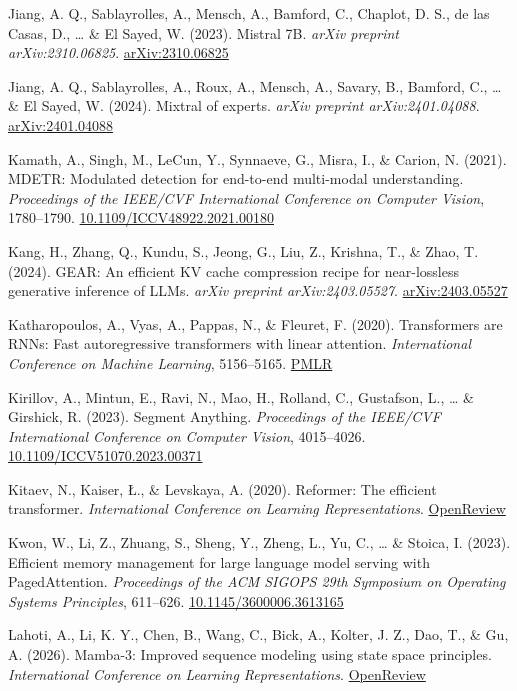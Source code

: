 \documentclass[10pt,twocolumn]{article}
\begin{document}
Jiang, A. Q., Sablayrolles, A., Mensch, A., Bamford, C., Chaplot, D. S., de las Casas, D., \ldots{} \& El Sayed, W. (2023). Mistral 7B. \emph{arXiv preprint arXiv:2310.06825}. \href{https://arxiv.org/abs/2310.06825}{arXiv:2310.06825}

Jiang, A. Q., Sablayrolles, A., Roux, A., Mensch, A., Savary, B., Bamford, C., \ldots{} \& El Sayed, W. (2024). Mixtral of experts. \emph{arXiv preprint arXiv:2401.04088}. \href{https://arxiv.org/abs/2401.04088}{arXiv:2401.04088}

Kamath, A., Singh, M., LeCun, Y., Synnaeve, G., Misra, I., \& Carion, N. (2021). MDETR: Modulated detection for end-to-end multi-modal understanding. \emph{Proceedings of the IEEE/CVF International Conference on Computer Vision}, 1780--1790. \href{https://doi.org/10.1109/ICCV48922.2021.00180}{10.1109/ICCV48922.2021.00180}

Kang, H., Zhang, Q., Kundu, S., Jeong, G., Liu, Z., Krishna, T., \& Zhao, T. (2024). GEAR: An efficient KV cache compression recipe for near-lossless generative inference of LLMs. \emph{arXiv preprint arXiv:2403.05527}. \href{https://arxiv.org/abs/2403.05527}{arXiv:2403.05527}

Katharopoulos, A., Vyas, A., Pappas, N., \& Fleuret, F. (2020). Transformers are RNNs: Fast autoregressive transformers with linear attention. \emph{International Conference on Machine Learning}, 5156--5165. \href{https://proceedings.mlr.press/v119/katharopoulos20a.html}{PMLR}

Kirillov, A., Mintun, E., Ravi, N., Mao, H., Rolland, C., Gustafson, L., \ldots{} \& Girshick, R. (2023). Segment Anything. \emph{Proceedings of the IEEE/CVF International Conference on Computer Vision}, 4015--4026. \href{https://doi.org/10.1109/ICCV51070.2023.00371}{10.1109/ICCV51070.2023.00371}

Kitaev, N., Kaiser, Ł., \& Levskaya, A. (2020). Reformer: The efficient transformer. \emph{International Conference on Learning Representations}. \href{https://openreview.net/forum?id=rkgNKkHtvB}{OpenReview}

Kwon, W., Li, Z., Zhuang, S., Sheng, Y., Zheng, L., Yu, C., \ldots{} \& Stoica, I. (2023). Efficient memory management for large language model serving with PagedAttention. \emph{Proceedings of the ACM SIGOPS 29th Symposium on Operating Systems Principles}, 611--626. \href{https://doi.org/10.1145/3600006.3613165}{10.1145/3600006.3613165}

Lahoti, A., Li, K. Y., Chen, B., Wang, C., Bick, A., Kolter, J. Z., Dao, T., \& Gu, A. (2026). Mamba-3: Improved sequence modeling using state space principles. \emph{International Conference on Learning Representations}. \href{https://openreview.net/forum?id=HwCvaJOiCj}{OpenReview}
\end{document}
